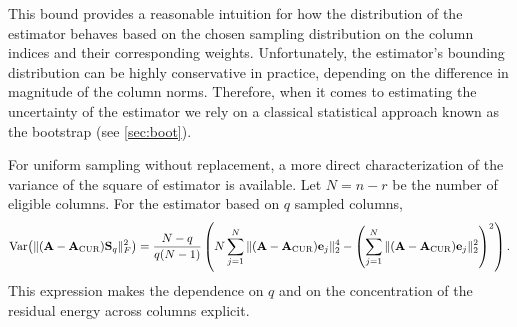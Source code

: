 \documentclass[11pt]{article}
\newcommand{\curX}{\mathbf{A}_{\textup{CUR}}}
\begin{document}
This bound provides a reasonable intuition for how the distribution of the estimator behaves based on the chosen sampling distribution on the column indices and their corresponding weights. Unfortunately, the estimator's bounding distribution can be highly conservative in practice, depending on the difference in magnitude of the column norms. Therefore, when it comes to estimating the uncertainty of the estimator we rely on a classical statistical approach known as the bootstrap (see \cref{sec:boot}).

For uniform sampling without replacement, a more direct characterization of the variance of the square of estimator is available. Let $N=n-r$ be the number of eligible columns. For the estimator based on $q$ sampled columns,
\begin{equation}\label{eq:uniform-var}
    \operatorname{Var}\!\left(\|(\mathbf{A}-\curX)\mathbf{S}_q\|_F^2\right)=\frac{N-q}{q(N-1)}\left(N\sum_{j=1}^{N}\|(\mathbf{A}-\curX)\mathbf{e}_j\|_2^4-\left(\sum_{j=1}^{N}\|(\mathbf{A}-\curX)\mathbf{e}_j\|_2^2\right)^2\right).
\end{equation}
This expression makes the dependence on $q$ and on the concentration of the residual energy across columns explicit.
\end{document}
